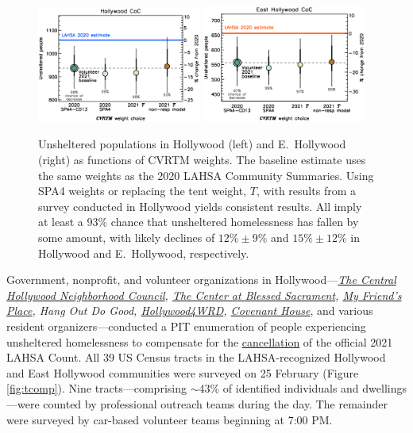 \documentclass[11pt]{article}
\def\resp{respectively}
\begin{document}
\begin{figure}[h!]
	\centering
	\includegraphics[width = 0.48\textwidth, trim = 0cm 0.5cm 0cm 0cm]{hwoodFinal}
	\includegraphics[width = 0.48\textwidth, trim = 0cm 0.5cm 0cm 0cm]{ehoFinal}	
	\caption{Unsheltered populations in Hollywood (left) and E.~Hollywood (right) 
			as functions of CVRTM weights. The baseline estimate uses the same weights as the 
			2020 LAHSA Community Summaries. Using SPA4 weights or replacing the tent 
			weight, $T$, with results from a survey conducted in Hollywood yields consistent
			results. All imply at least a 93\% chance that unsheltered homelessness has fallen
			by some amount, with likely declines of $12\%\pm9\%$ and $15\%\pm12\%$
			in Hollywood and E.~Hollywood, \resp.}
	\label{fig:wtComp}
\end{figure}

 Government, nonprofit, and volunteer organizations in Hollywood---{\it \href{https://chnc.org}
{The Central Hollywood Neighborhood Council}, \href{https://thecenterinhollywood.org}{The Center
at Blessed Sacrament}, \href{https://www.myfriendsplace.org/}{My Friend's Place}, Hang Out Do Good, \href{https://hollywood4wrd.live}
{Hollywood4WRD}, \href{https://www.covenanthouse.org/spring-meal-match?sourceid=2483460&origin=DHQEI2109EZI0N&utm_source=2103marchmealmatchweb&utm_medium=cpc&utm_campaign=FY21MarchMealMatch&utm_content=bsd2103marchmealmatchweb&gclid=CjwKCAiAp4KCBhB6EiwAxRxbpJA2yM7lM2tyAqjVALZgBGvjnhobCJJ0XmuELFDXzM5xxZ0BqyX1ChoCLi0QAvD_BwE}{Covenant House}}, and various resident organizers---conducted 
a PIT enumeration of people experiencing unsheltered homelessness to compensate for 
the \href{https://laist.com/latest/post/20201209/LAHSA-cancels-2021-homeless-count-los-angeles-covid-19}
{cancellation} of the official 2021 LAHSA Count. All 39 US Census tracts in the LAHSA-recognized Hollywood 
and East Hollywood communities were surveyed on 25 February (Figure \ref{fig:tcomp}). Nine tracts---comprising 
$\sim$43\% of identified individuals and dwellings---were counted by professional outreach teams during the 
day. The remainder were surveyed by car-based volunteer teams beginning at 7:00 PM.
\end{document}
